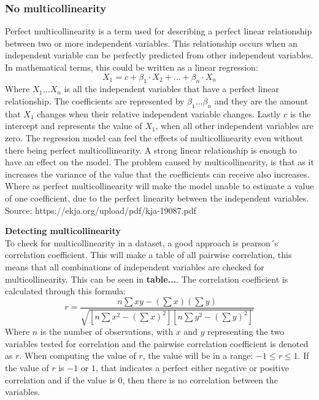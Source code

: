 	\subsubsection{No multicollinearity}
	Perfect multicollinearity is a term used for describing a perfect linear relationship between two or more independent variables. This relationship occurs when an independent variable can be perfectly predicted from other independent variables. In mathematical terms, this could be written as a linear regression:
	$$
	X_1 = c+\beta_1\cdot X_2+...+\beta_n\cdot X_n
	$$ 
	Where $X_1...X_n$ is all the independent variables that have a perfect linear relationship. The coefficients are represented by $\beta_1...\beta_n$ and they are the amount that $X_1$ changes when their relative independent variable changes.
	Lastly $c$ is the intercept and represents the value of $X_1$, when all other independent variables are zero.
	\newline
	The regression model can feel the effects of multicollinearity even without there being perfect multicollinearity. A strong linear relationship is enough to have an effect on the model. The problem caused by multicollinearity, is that as it increases the variance of the value that the coefficients can receive also increases. Where as perfect multicollinearity will make the model unable to estimate a value of one coefficient, due to the perfect linearity between the independent variables.
	\newline
	Source: https://ekja.org/upload/pdf/kja-19087.pdf
	
	\textbf{Detecting multicollinearity}\\
	To check for multicollinearity in a dataset, a good approach is pearson´s correlation coefficient. This will make a table of all pairwise correlation, this means that all combinations of independent variables are checked for multicollinearity. This can be seen in \textbf{table...}. The correlation coefficient is calculated through this formula:
	$$
	r = \frac{n \sum xy - (\sum x)(\sum y)}{\sqrt{[n \sum x^2 - (\sum x)^2][n \sum y^2 - (\sum y)^2]}}
	$$
	Where $n$ is the number of observations, with $x$ and $y$ representing the two variables tested for correlation and the pairwise correlation coefficient is denoted as $r$. When computing the value of $r$, the value will be in a range: $-1\leq r \leq 1$. If the value of $r$ is $-1$ or $1$, that indicates a perfect either negative or positive correlation and if the value is $0$, then there is no correlation between the variables.
